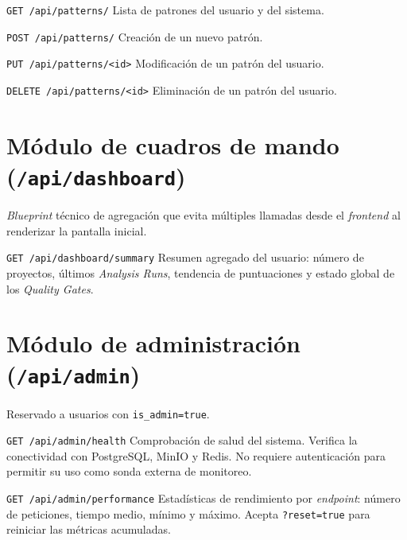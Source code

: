 \begin{definitionlist}
  \item[\texttt{GET /api/patterns/}]  Lista de patrones del usuario y del
    sistema.

  \item[\texttt{POST /api/patterns/}]  Creación de un nuevo patrón.

  \item[\texttt{PUT /api/patterns/<id>}]  Modificación de un patrón del
    usuario.

  \item[\texttt{DELETE /api/patterns/<id>}]  Eliminación de un patrón del
    usuario.
\end{definitionlist}


\section{Módulo de cuadros de mando (\texttt{/api/dashboard})}
\label{sec:api-dashboard}

\emph{Blueprint} técnico de agregación que evita múltiples llamadas desde
el \emph{frontend} al renderizar la pantalla inicial.

\begin{definitionlist}
  \item[\texttt{GET /api/dashboard/summary}]  Resumen agregado del usuario:
    número de proyectos, últimos \emph{Analysis Runs}, tendencia de
    puntuaciones y estado global de los \emph{Quality Gates}.
\end{definitionlist}


\section{Módulo de administración (\texttt{/api/admin})}
\label{sec:api-admin}

Reservado a usuarios con \texttt{is\_admin=true}.

\begin{definitionlist}
  \item[\texttt{GET /api/admin/health}]  Comprobación de salud del sistema.
    Verifica la conectividad con PostgreSQL, MinIO y Redis.  No requiere
    autenticación para permitir su uso como sonda externa de monitoreo.

  \item[\texttt{GET /api/admin/performance}]  Estadísticas de rendimiento
    por \emph{endpoint}: número de peticiones, tiempo medio, mínimo y
    máximo.  Acepta \texttt{?reset=true} para reiniciar las métricas
    acumuladas.
\end{definitionlist}



